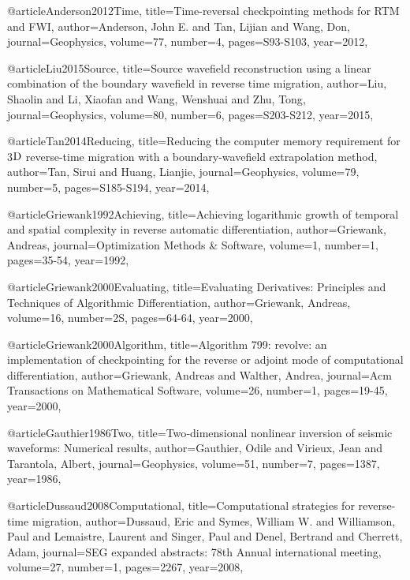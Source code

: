 {@article{Anderson2012Time,
  title={Time-reversal checkpointing methods for {RTM} and {FWI}},
  author={Anderson, John E. and Tan, Lijian and Wang, Don},
  journal={Geophysics},
  volume={77},
  number={4},
  pages={S93-S103},
  year={2012},
}

@article{Liu2015Source,
  title={Source wavefield reconstruction using a linear combination of the boundary wavefield in reverse time migration},
  author={Liu, Shaolin and Li, Xiaofan and Wang, Wenshuai and Zhu, Tong},
  journal={Geophysics},
  volume={80},
  number={6},
  pages={S203-S212},
  year={2015},
}

@article{Tan2014Reducing,
  title={Reducing the computer memory requirement for 3$\textnormal{D}$ reverse-time migration with a boundary-wavefield extrapolation method},
  author={Tan, Sirui and Huang, Lianjie},
  journal={Geophysics},
  volume={79},
  number={5},
  pages={S185-S194},
  year={2014},
}



@article{Griewank1992Achieving,
  title={Achieving logarithmic growth of temporal and spatial complexity in reverse automatic differentiation},
  author={Griewank, Andreas},
  journal={Optimization Methods \& Software},
  volume={1},
  number={1},
  pages={35-54},
  year={1992},
}

@article{Griewank2000Evaluating,
  title={Evaluating Derivatives: Principles and Techniques of Algorithmic Differentiation},
  author={Griewank, Andreas},
  volume={16},
  number={2S},
  pages={64-64},
  year={2000},
}

@article{Griewank2000Algorithm,
  title={Algorithm 799: revolve: an implementation of checkpointing for the reverse or adjoint mode of computational differentiation},
  author={Griewank, Andreas and Walther, Andrea},
  journal={Acm Transactions on Mathematical Software},
  volume={26},
  number={1},
  pages={19-45},
  year={2000},
}

@article{Gauthier1986Two,
  title={Two‐dimensional nonlinear inversion of seismic waveforms: Numerical results},
  author={Gauthier, Odile and Virieux, Jean and Tarantola, Albert},
  journal={Geophysics},
  volume={51},
  number={7},
  pages={1387},
  year={1986},
}

@article{Dussaud2008Computational,
  title={Computational strategies for reverse-time migration},
  author={Dussaud, Eric and Symes, William W. and Williamson, Paul and Lemaistre, Laurent and Singer, Paul and Denel, Bertrand and Cherrett, Adam},
  journal={SEG expanded abstracts: 78th Annual international meeting},
  volume={27},
  number={1},
  pages={2267},
  year={2008},
}

}
